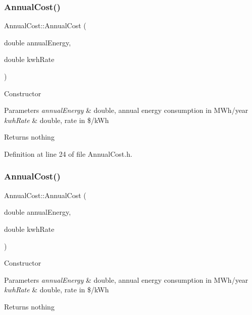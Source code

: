 \subsubsection{\texorpdfstring{Annual\+Cost()}{AnnualCost()}\hspace{0.1cm}{\footnotesize\ttfamily [2/3]}}
{\footnotesize\ttfamily Annual\+Cost\+::\+Annual\+Cost (\begin{DoxyParamCaption}\item[{double}]{annual\+Energy,  }\item[{double}]{kwh\+Rate }\end{DoxyParamCaption})\hspace{0.3cm}{\ttfamily [inline]}}

Constructor 
\begin{DoxyParams}{Parameters}
{\em annual\+Energy} & double, annual energy consumption in M\+Wh/year \\
\hline
{\em kwh\+Rate} & double, rate in \$/k\+Wh \\
\hline
\end{DoxyParams}
\begin{DoxyReturn}{Returns}
nothing 
\end{DoxyReturn}


Definition at line 24 of file Annual\+Cost.\+h.

\mbox{\label{class_annual_cost_a723513a7074d1799e2bf410b60b3146f}} 
\subsubsection{\texorpdfstring{Annual\+Cost()}{AnnualCost()}\hspace{0.1cm}{\footnotesize\ttfamily [3/3]}}
{\footnotesize\ttfamily Annual\+Cost\+::\+Annual\+Cost (\begin{DoxyParamCaption}\item[{double}]{annual\+Energy,  }\item[{double}]{kwh\+Rate }\end{DoxyParamCaption})\hspace{0.3cm}{\ttfamily [inline]}}

Constructor 
\begin{DoxyParams}{Parameters}
{\em annual\+Energy} & double, annual energy consumption in M\+Wh/year \\
\hline
{\em kwh\+Rate} & double, rate in \$/k\+Wh \\
\hline
\end{DoxyParams}
\begin{DoxyReturn}{Returns}
nothing 
\end{DoxyReturn}


